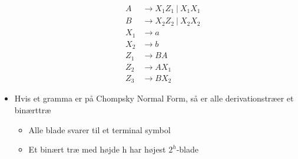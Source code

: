 \documentclass[a4, danish]{article}
\begin{document}
\begin{itemize}
\begin{enumerate}
\begin{align*}
     A &\rightarrow X_1Z_1  \ | \ X_1X_1 \\
     B &\rightarrow X_2Z_2  \ | \ X_2X_2 \\
     X_1 &\rightarrow a \\
     X_2 &\rightarrow b \\
     Z_1 &\rightarrow BA \\
     Z_2 &\rightarrow AX_1 \\
     Z_3 &\rightarrow BX_2 
   \end{align*}
   \end{enumerate}
  \item Hvis et gramma er på Chompsky Normal Form, så er alle derivationstræer et binærttræ
  \begin{itemize}
  	\item Alle blade svarer til et terminal symbol 
    \item Et binært træ med højde h har højest $2^h$-blade
  \end{itemize}
\end{itemize}
\end{document}
